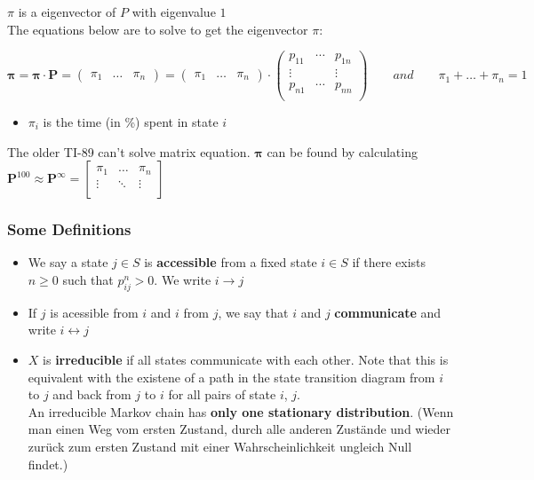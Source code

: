 $\pi$ is a eigenvector of $P$ with eigenvalue $1$\\

The equations below are to solve to get the eigenvector $\pi$:

\begin{equation}
\bm{\pi}=\bm{\pi}\cdot \bm{P}=\begin{pmatrix}\pi_1& \ldots & \pi_n\end{pmatrix}=\begin{pmatrix}\pi_1& \ldots & \pi_n\end{pmatrix}\cdot\begin{pmatrix}
		p_{11} &\cdots & p_{1n}\\
		\vdots& & 	\vdots\\
		p_{n1} &\cdots & p_{nn}\\
	\end{pmatrix}\qquad and\qquad\pi_1+\ldots+\pi_n=1\nonumber
\end{equation}

\begin{itemize}
\item $\pi_i$ is the time (in \%) spent in state $i$
\end{itemize}

The older TI-89 can't solve matrix equation. $\bm \pi$ can be found by calculating 
$\bm P^{100} \approx \bm P^\infty = \begin{bmatrix}\pi_1 & \ldots & \pi_n\\ \vdots &\ddots &\vdots\\\end{bmatrix}$

\subsubsection{Some Definitions }
\begin{itemize}
\item We say a state $j\in S$ is \textbf{accessible} from a fixed state $i\in S$ if there exists $n\geq 0 $ such that $p_{ij}^n>0$. We write $i\rightarrow j$
\item If $j$ is acessible from $i$ and $i$ from $j$, we say that $i$ and $j$ \textbf{communicate} and write $i \leftrightarrow j$
\item $X$ is \textbf{irreducible} if all states communicate with each other. Note that this is equivalent with the existene of a path in the state transition diagram from $i$ to $j$ and back from $j$ to $i$ for all pairs of state $i$, $j$.\\

An irreducible Markov chain has \textbf{only one stationary distribution}.
(Wenn man einen Weg vom ersten Zustand, durch alle anderen Zustände und wieder zurück zum ersten Zustand mit einer Wahrscheinlichkeit ungleich Null findet.)
\end{itemize}

